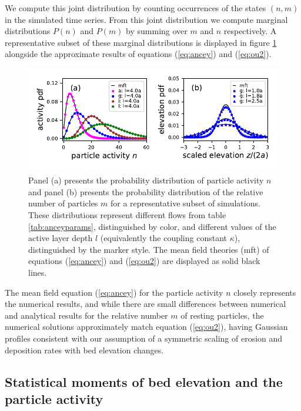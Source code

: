 We compute this joint distribution by counting occurrences of the states $(n,m)$ in the simulated time series.
From this joint distribution we compute marginal distributions $P(n)$ and $P(m)$ by summing over $m$ and $n$ respectively.
A representative subset of these marginal distributions is displayed in figure \ref{fig:pdfs} alongside the approximate results of equations (\ref{eq:ancey}) and (\ref{eq:ou2}).
\begin{figure}[!htbp]
	\includegraphics[width=\linewidth,keepaspectratio]{./figures/ch3/distributions.pdf}
	\caption{Panel (a) presents the probability distribution of particle activity $n$ and panel (b) presents the probability distribution of the relative number of particles $m$ for a representative subset of simulations. These distributions represent different flows from table \ref{tab:anceyparams}, distinguished by color, and different values of the active layer depth $l$ (equivalently the coupling constant $\kappa$), distinguished by the marker style. The mean field theories (mft) of equations (\ref{eq:ancey}) and (\ref{eq:ou2}) are displayed as solid black lines.}
	\label{fig:pdfs}
\end{figure}
The mean field equation (\ref{eq:ancey}) for the particle activity $n$ closely represents the numerical results, and while there are small differences between numerical and analytical results for the relative number $m$ of resting particles, the numerical solutions approximately match equation (\ref{eq:ou2}), having Gaussian profiles consistent with our assumption of a symmetric scaling of erosion and deposition rates with bed elevation changes. 


\subsection{Statistical moments of bed elevation and the particle activity}
\label{sec:mom}

